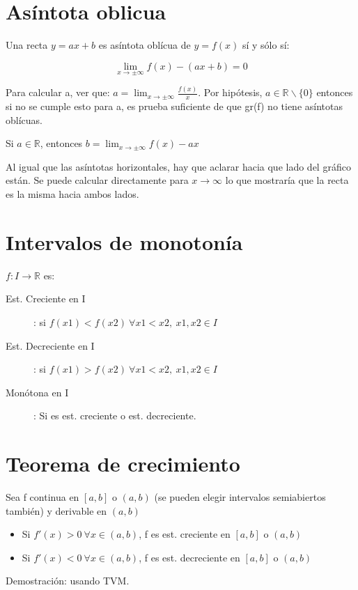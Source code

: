 \documentclass{report}
\begin{document}
	\section{Asíntota oblicua}
		Una recta $y=ax+b$ es asíntota oblícua de $y=f(x)$ sí y sólo sí:
		
		$$\lim_{x \to \pm\infty}f(x)-(ax+b)=0$$
		
		Para calcular a, ver que: $a=\lim_{x \to \pm\infty}\frac{f(x)}{x}$. Por hipótesis, $a \in \mathbb{R}\backslash\{0\}$ entonces si no se cumple esto para a, es prueba suficiente de que gr(f) no tiene asíntotas oblícuas.
		
		Si $a \in \mathbb{R}$, entonces $b=\lim_{x \to \pm\infty}f(x)-ax$
		
		Al igual que las asíntotas horizontales, hay que aclarar hacia que lado del gráfico están. Se puede calcular directamente para $x \to \infty$ lo que mostraría que la recta es la misma hacia ambos lados.
		
	\section{Intervalos de monotonía}
		$f:I\to\mathbb{R}$ es:
		
		\begin{description}
			\item[Est. Creciente en I]: si $f(x1)<f(x2) \ \forall x1<x2 , \ x1,x2 \in I$
			\item[Est. Decreciente en I]: si $f(x1)>f(x2) \ \forall x1<x2 , \ x1,x2 \in I$
			\item[Monótona en I]: Si es est. creciente o est. decreciente.
		\end{description}
	
	\section{Teorema de crecimiento}
		Sea f continua en $[a,b]$ o $(a,b)$ (se pueden elegir intervalos semiabiertos también) y derivable en $(a,b)$
		
		\begin{itemize}
			\item Si $f'(x)>0 \ \forall x \in (a,b)$, f es est. creciente en $[a,b]$ o $(a,b)$
			\item Si $f'(x)<0 \ \forall x \in (a,b)$, f es est. decreciente en $[a,b]$ o $(a,b)$
		\end{itemize}
	
		Demostración: usando TVM.
		
\end{document}
